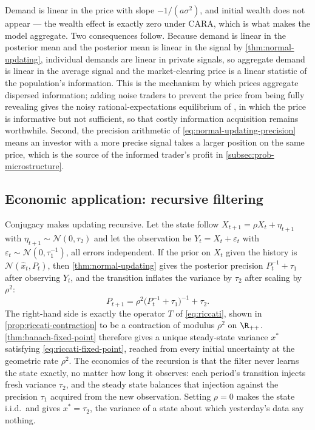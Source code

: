 Demand is linear in the price with slope $-1/(a\sigma^{2})$, and initial wealth
does not appear --- the wealth effect is exactly zero under CARA, which is what
makes the model aggregate. Two consequences follow. Because demand is linear in
the posterior mean and the posterior mean is linear in the signal by
\autoref{thm:normal-updating}, individual demands are linear in private signals,
so aggregate demand is linear in the average signal and the market-clearing price
is a linear statistic of the population's information. This is the mechanism by
which prices aggregate dispersed information; adding noise traders to prevent the
price from being fully revealing gives the noisy rational-expectations
equilibrium of \textcite{grossman1980impossibility}, in which the price is
informative but not sufficient, so that costly information acquisition remains
worthwhile. Second, the precision arithmetic of \eqref{eq:normal-updating-precision}
means an investor with a more precise signal takes a larger position on the same
price, which is the source of the informed trader's profit in
\autoref{subsec:prob-microstructure}.

\subsection{Economic application: recursive filtering}\label{subsec:prob-kalman}

Conjugacy makes updating recursive. Let the state follow
$X_{t+1}=\rho X_t+\eta_{t+1}$ with $\eta_{t+1}\sim\mathcal{N}(0,\tau_2)$ and let the
observation be $Y_t=X_t+\varepsilon_t$ with
$\varepsilon_t\sim\mathcal{N}(0,\tau_1^{-1})$, all errors independent. If the prior
on $X_t$ given the history is $\mathcal{N}(\hat x_t,P_t)$, then
\autoref{thm:normal-updating} gives the posterior precision
$P_t^{-1}+\tau_1$ after observing $Y_t$, and the transition inflates the variance
by $\tau_2$ after scaling by $\rho^{2}$:
\begin{equation}\label{eq:riccati-recursion}
	P_{t+1}=\rho^{2}\bigl(P_t^{-1}+\tau_1\bigr)^{-1}+\tau_2 .
\end{equation}
The right-hand side is exactly the operator $T$ of \eqref{eq:riccati}, shown in
\autoref{prop:riccati-contraction} to be a contraction of modulus $\rho^{2}$ on
$\R_{++}$. \autoref{thm:banach-fixed-point} therefore gives a unique steady-state
variance $x^{\ast}$ satisfying \eqref{eq:riccati-fixed-point}, reached from every
initial uncertainty at the geometric rate $\rho^{2}$. The economics of the
recursion is that the filter never learns the state exactly, no matter how long
it observes: each period's transition injects fresh variance $\tau_2$, and the
steady state balances that injection against the precision $\tau_1$ acquired from
the new observation. Setting $\rho=0$ makes the state i.i.d.\ and gives
$x^{\ast}=\tau_2$, the variance of a state about which yesterday's data say
nothing.

